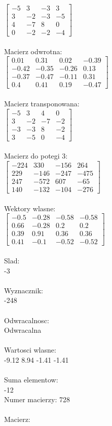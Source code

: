 \documentclass[a4paper,12pt]{article}
\begin{document}
$\begin{bmatrix} -5&3&-3&3\\3&-2&-3&-5\\4&-7&8&0\\0&-2&-2&-4 \end{bmatrix}$
\\
\\
Macierz odwrotna:\\

$\begin{bmatrix} 0.01&0.31&0.02&-0.39\\-0.42&-0.35&-0.26&0.13\\-0.37&-0.47&-0.11&0.31\\0.4&0.41&0.19&-0.47 \end{bmatrix}$
\\
\\
Macierz transponowana:\\

$\begin{bmatrix} -5&3&4&0\\3&-2&-7&-2\\-3&-3&8&-2\\3&-5&0&-4 \end{bmatrix}$
\\
\\
Macierz do potegi 3:\\

$\begin{bmatrix} -224&330&-156&264\\229&-146&-247&-475\\247&-572&607&-65\\140&-132&-104&-276 \end{bmatrix}$
\\
\\
Wektory wlasne:\\

$\begin{bmatrix} -0.5&-0.28&-0.58&-0.58\\0.66&-0.28&0.2&0.2\\0.39&0.91&0.36&0.36\\0.41&-0.1&-0.52&-0.52 \end{bmatrix}$
\\
\\
Slad:\\
-3
\\
\\
Wyznacznik:\\
-248
\\
\\
Odwracalnosc:\\
Odwracalna
\\
\\
Wartosci wlasne:\\
-9.12 8.94 -1.41 -1.41
\\
\\
Suma elementow:\\
-12
\\
\newpage
Numer macierzy:
728
\\
\\
Macierz:\\
\end{document}
